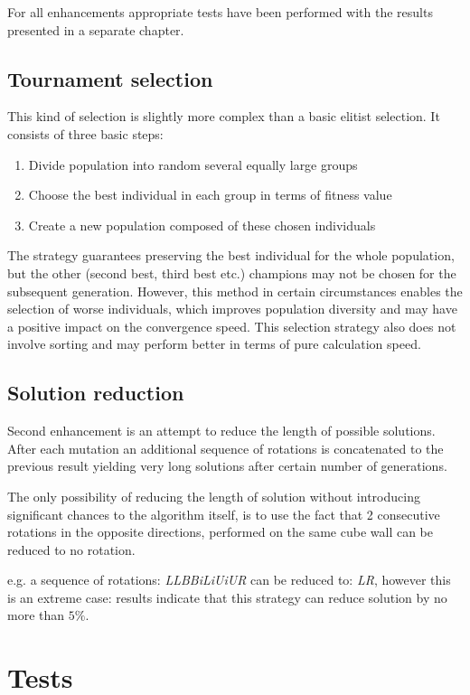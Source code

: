 \documentclass[a4paper]{article}
\begin{document}
For all enhancements appropriate tests have been performed with the results presented in a separate chapter.

\subsection{Tournament selection}
This kind of selection is slightly more complex than a basic elitist selection. It consists of three basic steps:
\begin{enumerate}
\item Divide population into random several equally large groups
\item Choose the best individual in each group in terms of fitness value
\item Create a new population composed of these chosen individuals
\end{enumerate}

The strategy guarantees preserving the best individual for the whole population, but the other (second best, third best etc.) champions may not be chosen for the subsequent generation.
However, this method in certain circumstances enables the selection of worse individuals, which improves population diversity and may have a positive impact on the convergence speed.
This selection strategy also does not involve sorting and may perform better in terms of pure calculation speed.

\subsection{Solution reduction}
Second enhancement is an attempt to reduce the length of possible solutions. After each mutation an additional sequence of rotations is concatenated to the previous result yielding very long solutions after certain number of generations.

The only possibility of reducing the length of solution without introducing significant chances to the algorithm itself,
is to use the fact that 2 consecutive rotations in the opposite directions, performed on the same cube wall can be reduced to no rotation.

e.g. a sequence of rotations: \textit{LLBBiLiUiUR} can be reduced to: \textit{LR}, however this is an extreme case: results indicate that this strategy can reduce solution by no more than $5\%$.

\section{Tests}
\end{document}

